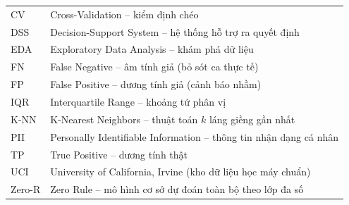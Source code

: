 \begin{tabular}{ll}
CV & Cross-Validation -- kiểm định chéo \\
DSS & Decision-Support System -- hệ thống hỗ trợ ra quyết định \\
EDA & Exploratory Data Analysis -- khám phá dữ liệu \\
FN & False Negative -- âm tính giả (bỏ sót ca thực tế) \\
FP & False Positive -- dương tính giả (cảnh báo nhầm) \\
IQR & Interquartile Range -- khoảng tứ phân vị \\
K-NN & K-Nearest Neighbors -- thuật toán $k$ láng giềng gần nhất \\
PII & Personally Identifiable Information -- thông tin nhận dạng cá nhân \\
TP & True Positive -- dương tính thật \\
UCI & University of California, Irvine (kho dữ liệu học máy chuẩn) \\
Zero-R & Zero Rule -- mô hình cơ sở dự đoán toàn bộ theo lớp đa số \\
\end{tabular}
